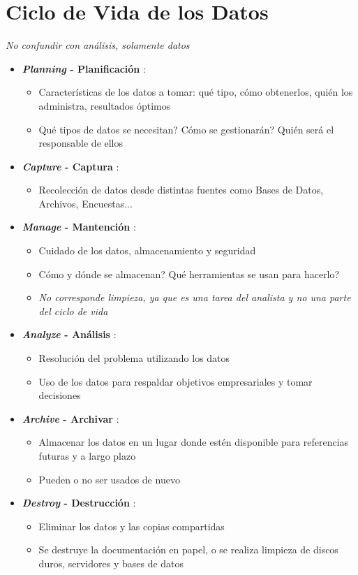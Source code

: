 \section{Ciclo de Vida de los Datos}

\textit{No confundir con análisis, solamente datos}

\begin{itemize}
    \item {\textbf{\textit{Planning} - Planificación} :
    \begin{itemize}
        \item {Características de los datos a tomar: qué tipo, cómo obtenerlos, quién los administra, resultados óptimos}
        \item {Qué tipos de datos se necesitan? Cómo se gestionarán? Quién será el responsable de ellos}
    \end{itemize}}
    \item {\textbf{\textit{Capture} - Captura} :
    \begin{itemize}
        \item {Recolección de datos desde distintas fuentes como Bases de Datos, Archivos, Encuestas...}
    \end{itemize}}
    \item {\textbf{\textit{Manage} - Mantención} :
    \begin{itemize}
        \item {Cuidado de los datos, almacenamiento y seguridad}
        \item {Cómo y dónde se almacenan? Qué herramientas se usan para hacerlo?}
        \item {\textit{No corresponde limpieza, ya que es una tarea del analista y no una parte del ciclo de vida}}
    \end{itemize}}
    \item {\textbf{\textit{Analyze} - Análisis} :
    \begin{itemize}
        \item {Resolución del problema utilizando los datos}
        \item {Uso de los datos para respaldar objetivos empresariales y tomar decisiones}
    \end{itemize}}
    \item {\textbf{\textit{Archive} - Archivar} :
    \begin{itemize}
        \item {Almacenar los datos en un lugar donde estén disponible para referencias futuras y a largo plazo}
        \item {Pueden o no ser usados de nuevo}
    \end{itemize}}
    \item {\textbf{\textit{Destroy} - Destrucción} :
    \begin{itemize}
       \item {Eliminar los datos y las copias compartidas}
       \item {Se destruye la documentación en papel, o se realiza limpieza de discos duros, servidores y bases de datos}
    \end{itemize}}
\end{itemize}

